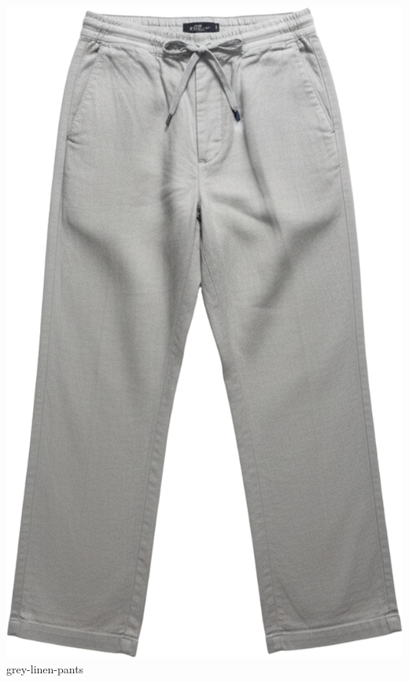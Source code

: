 \documentclass[10pt]{article}
\begin{document}
\begin{minipage}[t]{0.22\textwidth}\centering\vspace{0mm}
\includegraphics[width=\linewidth,keepaspectratio]{assets/pants/grey-linen-pants.png}\\
\vspace{0.5mm}\tiny grey-linen-pants\end{minipage}
\end{document}
